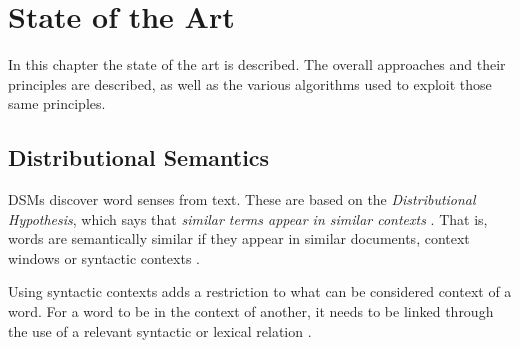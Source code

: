 \chapter{State of the Art}
\label{ch:stateofart}

In this chapter the state of the art is described. The overall approaches and
their principles are described, as well as the various algorithms used to
exploit those same principles.

\section{Distributional Semantics}

\acp{DSM} discover word senses from text. These are based on the
\textit{Distributional Hypothesis}, which says that \textit{similar terms
appear in similar contexts} \cite{curran2004distributional}. That is, words are
semantically similar if they appear in similar documents, context windows or
syntactic contexts \cite{van2010mining}.

Using syntactic contexts adds a restriction to what can be considered context of
a word. For a word to be in the context of another, it needs to be linked
through the use of a relevant syntactic or lexical relation
\cite{baroni2010distributional}.







